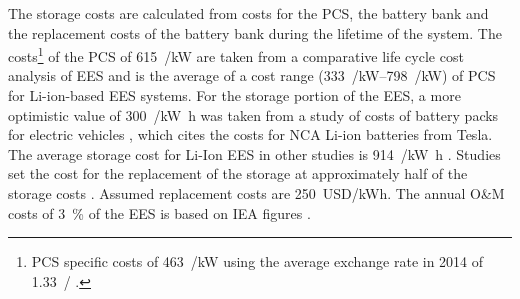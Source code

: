 
The storage costs are calculated from costs for the PCS, the battery bank and the replacement costs of the battery bank during the lifetime of the system. The costs\footnote{PCS specific costs of \SI{463}{\eur/\kilo\watt} \cite{Zakeri2015} using the average exchange rate in 2014 of \SI{1.33}{\usd/\eur} \cite{StatistaGmbH2015}.} of the PCS of \SI{615}{\usd/\kilo\watt} are taken from a comparative life cycle cost analysis of EES \cite{Zakeri2015} and is the average of a cost range (\SIrange{333}{798}{\usd/\kilo\watt}) of PCS for Li-ion-based EES systems. For the storage portion of the EES, a more optimistic value of \SI{300}{\usd/\kilo\watt\hour} was taken from a study of costs of battery packs for electric vehicles \cite{Nykvist2015}, which cites the costs for NCA Li-ion batteries from Tesla. The average storage cost for Li-Ion EES in other studies is \SI{914}{\usd/\kilo\watt\hour} \cite{Zakeri2015}. Studies set the cost for the replacement of the storage at approximately half of the storage costs \cite{Zakeri2015}. Assumed replacement costs are \SI{250}{USD/kWh}. The annual O\&M costs of \SI{3}{\percent} of the EES is based on IEA figures \cite{IEA2014c}.

